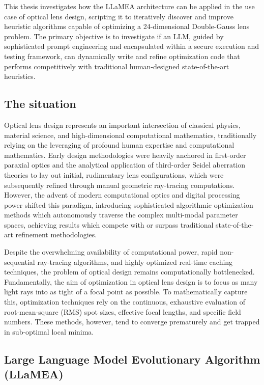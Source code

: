 \documentclass[12pt]{article}
\begin{document}
This thesis investigates how the LLaMEA architecture can be applied in the use case of optical lens design, scripting it to iteratively discover and improve heuristic algorithms capable of optimizing a 24-dimensional Double-Gauss lens problem. The primary objective is to investigate if an LLM, guided by sophisticated prompt engineering and encapsulated within a secure execution and testing framework, can dynamically write and refine optimization code that performs competitively with traditional human-designed state-of-the-art heuristics. 


\subsection{The situation}
Optical lens design represents an important intersection of classical physics, material science, and high-dimensional computational mathematics, traditionally relying on the leveraging of profound human expertise and computational mathematics. Early design methodologies were heavily anchored in first-order paraxial optics and the analytical application of third-order Seidel aberration theories to lay out initial, rudimentary lens configurations, which were subsequently refined through manual geometric ray-tracing computations. However, the advent of modern computational optics and digital processing power shifted this paradigm, introducing sophisticated algorithmic optimization methods which autonomously traverse the complex multi-modal parameter spaces, achieving results which compete with or surpass traditional state-of-the-art refinement methodologies.

Despite the overwhelming availability of computational power, rapid non-sequential ray-tracing algorithms, and highly optimized real-time caching techniques, the problem of optical design remains computationally bottlenecked. Fundamentally, the aim of optimization in optical lens design is to focus as many light rays into as tight of a focal point as possible. To mathematically capture this, optimization techniques rely on the continuous, exhaustive evaluation of root-mean-square (RMS) spot sizes, effective focal lengths, and specific field numbers. These methods, however, tend to converge prematurely and get trapped in sub-optimal local minima.


\subsection{Large Language Model Evolutionary Algorithm (LLaMEA)}
\end{document}
